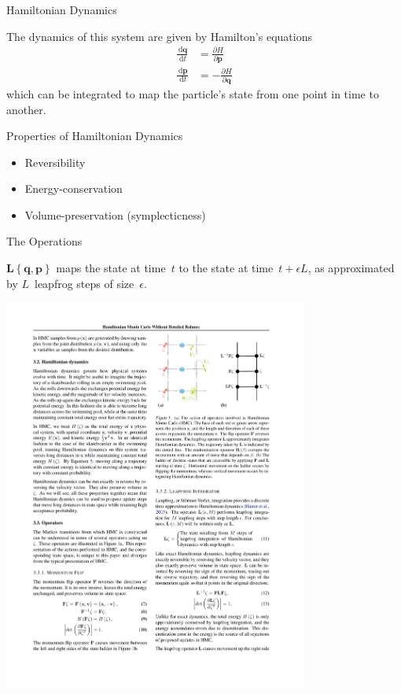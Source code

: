 \documentclass{beamer}
\newcommand{\dd}{\, \text{d}}
\renewcommand{\vec}[1]{\ensuremath{\mathbf{#1}}}
\newcommand{\op}[1]{\ensuremath{\mathbf{#1}}}
\begin{document}
    \begin{frame}{Hamiltonian Dynamics}

        The dynamics of this system are given by Hamilton's equations
            \begin{align*}
                \frac{\dd \vec{q}}{\dd t} &= \frac{\partial H}{\partial \vec{p}} \\
                \frac{\dd \vec{p}}{\dd t} &= -\frac{\partial H}{\partial \vec{q}}
            \end{align*}
        which can be integrated to map the particle's state from one point in time to another.

    \end{frame}

    \begin{frame}{Properties of Hamiltonian Dynamics}
        \begin{itemize}
            \item Reversibility
            \item Energy-conservation
            \item Volume-preservation (symplecticness)
        \end{itemize}
    \end{frame}

    \begin{frame}{The Operations}

        \begin{definition}
            $\op{L}\left\{\vec{q},\vec{p}\right\}$ maps the state at time~$t$ to the state at time~$t + \epsilon L$, as approximated by $L$~leapfrog steps of size~$\epsilon$.
        \end{definition}

        \vfill

        \centering
        \includegraphics[width=0.75\textwidth]{L.pdf}

    \end{frame}
\end{document}

